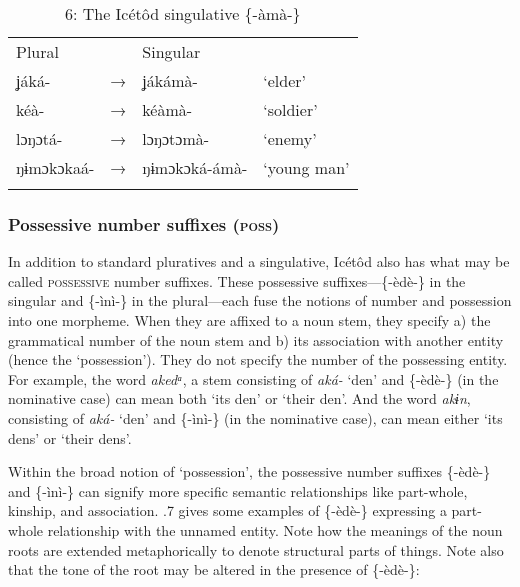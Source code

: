 \begin{table}
\caption{6: The Icétôd singulative \{-àmà-\}}
\label{tab:4}


\begin{tabularx}{\textwidth}{XXXX}
\lsptoprule

Plural &  & Singular & \\
ʝáká- & → & ʝákámà- & ‘elder’\\
kéà- & → & kéàmà- & ‘soldier’\\
lɔŋɔtá- & → & lɔŋɔtɔmà- & ‘enemy’\\
ŋɨmɔkɔkaá- & → & ŋɨmɔkɔká-ámà- & ‘young man’\\
\lspbottomrule
\end{tabularx}
\end{table}

\subsubsection{Possessive number suffixes (\textsc{poss})}

In addition to standard pluratives and a singulative, Icétôd also has what may be called \textsc{possessive} number suffixes. These possessive suffixes—\{-èdè-\} in the singular and \{-ìnì-\} in the plural—each fuse the notions of number and possession into one morpheme. When they are affixed to a noun stem, they specify a) the grammatical number of the noun stem and b) its association with another entity (hence the ‘possession’). They do not specify the number of the possessing entity. For example, the word \textit{akedᵃ}, a stem consisting of \textit{aká-} ‘den’ and \{-èdè-\} (in the nominative case) can mean both ‘its den’ or ‘their den’. And the word \textit{akɨn}, consisting of \textit{aká-} ‘den’ and \{-ìnì-\} (in the nominative case), can mean either ‘its dens’ or ‘their dens’. 

Within the broad notion of ‘possession’, the possessive number suffixes \{-èdè-\} and \{-ìnì-\} can signify more specific semantic relationships like part-whole, kinship, and association. .7 gives some examples of \{-èdè-\} expressing a part-whole relationship with the unnamed entity. Note how the meanings of the noun roots are extended metaphorically to denote structural parts of things. Note also that the tone of the root may be altered in the presence of \{-èdè-\}:



